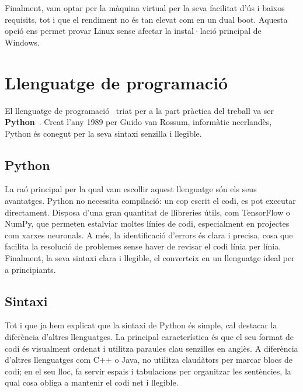 Finalment, vam optar per la màquina virtual per la seva facilitat d’ús i baixos requisits, tot i que el rendiment no és tan elevat com en un dual boot. Aquesta opció ens permet provar Linux sense afectar la instal·lació principal de Windows.

\clearpage
\section{Llenguatge de programació}\label{sec:4.4}
El llenguatge de programació~\cite{LlenguatgeDeProgramacio} triat per a la part pràctica del treball va ser \textbf{Python}~\cite{Python}. Creat l'any 1989 per Guido van Rossum, informàtic neerlandès, Python és conegut per la seva sintaxi senzilla i llegible.

\subsection{Python}
La raó principal per la qual vam escollir aquest llenguatge són els seus avantatges. Python no necessita compilació: un cop escrit el codi, es pot executar directament. Disposa d’una gran quantitat de llibreries útils, com TensorFlow o NumPy, que permeten estalviar moltes línies de codi, especialment en projectes com xarxes neuronals. A més, la identificació d’errors és clara i precisa, cosa que facilita la resolució de problemes sense haver de revisar el codi línia per línia. Finalment, la seva sintaxi clara i llegible, el converteix en un llenguatge ideal per a principiants.
\subsection{Sintaxi}
Tot i que ja hem explicat que la sintaxi de Python és simple, cal destacar la diferència d’altres llenguatges. La principal característica és que el seu format de codi és visualment ordenat i utilitza paraules clau senzilles en anglès. A diferència d’altres llenguatges com C++ o Java, no utilitza claudàtors per marcar blocs de codi; en el seu lloc, fa servir espais i tabulacions per organitzar les sentències, la qual cosa obliga a mantenir el codi net i llegible.

